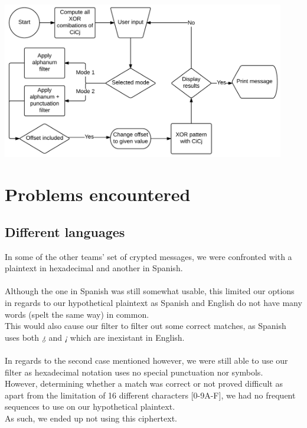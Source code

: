 \documentclass[a4paper,11pt]{article}
\begin{document}
\begin{flushright}
    \includegraphics[width=350pt,keepaspectratio]{images/diagram.png}
\end{flushright}


\newpage

\section{Problems encountered}

\subsection{Different languages}
In some of the other teams' set of crypted messages, we were confronted with a plaintext in hexadecimal and another in Spanish. \\
\\
Although the one in Spanish was still somewhat usable, this limited our options in regards to our hypothetical plaintext as Spanish and English do not have many words (spelt the same way) in common. \\
This would also cause our filter to filter out some correct matches, as Spanish uses both \textit{¿} and \textit{¡} which are inexistant in English. \\
\\
In regards to the second case mentioned however, we were still able to use our filter as hexadecimal notation uses no special punctuation nor symbols. \\
However, determining whether a match was correct or not proved difficult as apart from the limitation of 16 different characters [0-9A-F], we had no frequent sequences to use on our hypothetical plaintext. \\
As such, we ended up not using this ciphertext.
\end{document}
